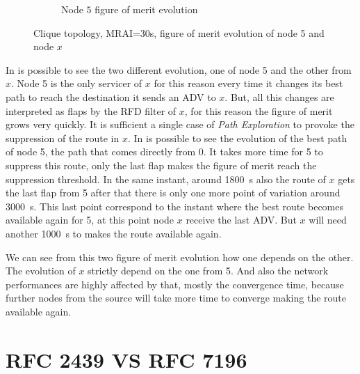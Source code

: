 \begin{figure}[h]
\begin{subfigure}[b]{0.494\textwidth}
         \caption{Node $5$ figure of merit evolution}
         \label{fig:clique_node5_30}
     \end{subfigure}
        \caption{Clique topology, MRAI=30s, figure of merit evolution
		of node \num{5} and node $x$}
        \label{fig:RFD_2439_figure_of_merit}
\end{figure}

In  is possible to see the two different
evolution, one of node \num{5} and the other from $x$.
Node \num{5} is the only servicer of $x$ for this reason every time it changes
its best path to reach the destination it sends an \ac{ADV} to $x$.
But, all this changes are interpreted as flaps by the \ac{RFD} filter of $x$,
for this reason the figure of merit grows very quickly.
It is sufficient a single case of \textit{Path Exploration} to provoke the
suppression of the route in $x$.
In  is possible to see the evolution of the best path
of node \num{5}, the path that comes directly from \num{0}.
It takes more time for \num{5} to suppress this route, only the last flap
makes the figure of merit reach the suppression threshold.
In the same instant, around \SI{1800}{\second} also the route of $x$ gets the
last flap from \num{5} after that there is only one more point of variation
around \SI{3000}{\second}.
This last point correspond to the instant where the best route becomes available
again for \num{5}, at this point node $x$ receive the last \ac{ADV}.
But $x$ will need another \SI{1000}{\second} to makes the route available again.

We can see from this two figure of merit evolution how one depends on the other.
The evolution of $x$ strictly depend on the one from \num{5}.
And also the network performances are highly affected by that, mostly the convergence
time, because further nodes from the source will take more time to converge making
the route available again.

\section{RFC 2439 VS RFC 7196}
\label{sec:rfd_2439_Vs_7196}


